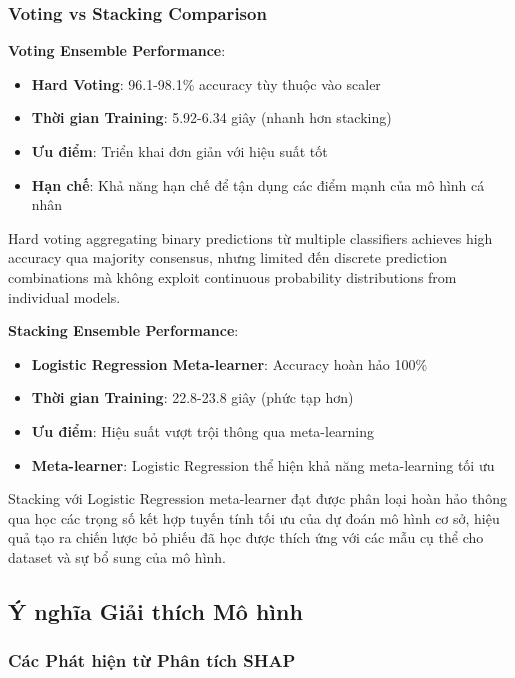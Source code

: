\subsubsection{Voting vs Stacking Comparison}

\textbf{Voting Ensemble Performance}:
\begin{itemize}
    \item \textbf{Hard Voting}: 96.1-98.1\% accuracy tùy thuộc vào scaler
    \item \textbf{Thời gian Training}: 5.92-6.34 giây (nhanh hơn stacking)
    \item \textbf{Ưu điểm}: Triển khai đơn giản với hiệu suất tốt
    \item \textbf{Hạn chế}: Khả năng hạn chế để tận dụng các điểm mạnh của mô hình cá nhân
\end{itemize}
Hard voting aggregating binary predictions từ multiple classifiers achieves high accuracy qua majority consensus, nhưng limited đến discrete prediction combinations mà không exploit continuous probability distributions from individual models.

\textbf{Stacking Ensemble Performance}:
\begin{itemize}
    \item \textbf{Logistic Regression Meta-learner}: Accuracy hoàn hảo 100\%
    \item \textbf{Thời gian Training}: 22.8-23.8 giây (phức tạp hơn)
    \item \textbf{Ưu điểm}: Hiệu suất vượt trội thông qua meta-learning
    \item \textbf{Meta-learner}: Logistic Regression thể hiện khả năng meta-learning tối ưu
\end{itemize}
Stacking với Logistic Regression meta-learner đạt được phân loại hoàn hảo thông qua học các trọng số kết hợp tuyến tính tối ưu của dự đoán mô hình cơ sở, hiệu quả tạo ra chiến lược bỏ phiếu đã học được thích ứng với các mẫu cụ thể cho dataset và sự bổ sung của mô hình.

\subsection{Ý nghĩa Giải thích Mô hình}\label{subsec:detailed-interpretability-insights}

\subsubsection{Các Phát hiện từ Phân tích SHAP}

